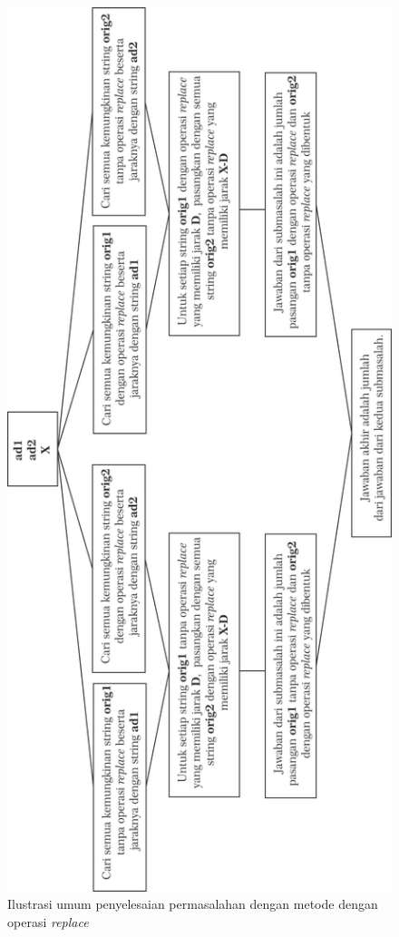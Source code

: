 \begin{figure}
	\centerline{ \includegraphics[scale=0.25]{assets/images/jpg/ilustrasi-umum-dengan-replace-rotated.jpg}}
	\caption{Ilustrasi umum penyelesaian permasalahan dengan metode \meetinthemiddle{} dengan operasi \textit{replace}}
	\label{figure:ilustrasi_umum_penyelesaian_meet_in_the_middle_dengan_operasi_replace}
\end{figure}

